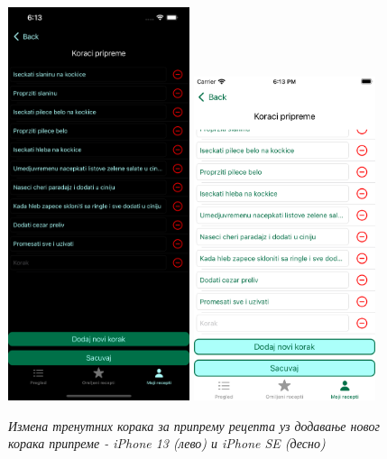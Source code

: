 \documentclass[12pt,oneside]{memoir}
\begin{document}
\begin{figure} [H]
    \centering
    \captionsetup{justification=centering}
    \includegraphics[width=0.475\textwidth]{images/simulators/view images/dark - steps2.png} 
    \hfill
    \includegraphics[width=0.475\textwidth]{images/simulators/view images/light - steps2.png} 
    \caption{\textit{Измена тренутних корака за припрему рецепта уз додавање новог корака припреме - iPhone 13 (лево) и iPhone SE (десно)}}
    \label{slika:измена_корака_2_1}
\end{figure}
\end{document}
